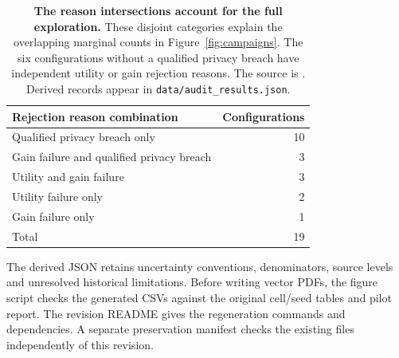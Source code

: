 \begin{table}[h]
\centering\small
\begin{tabular}{@{}lr@{}}
\toprule
Rejection reason combination & Configurations \\
\midrule
Qualified privacy breach only & 10 \\
Gain failure and qualified privacy breach & 3 \\
Utility and gain failure & 3 \\
Utility failure only & 2 \\
Gain failure only & 1 \\
\midrule
Total & 19 \\
\bottomrule
\end{tabular}
\caption{\textbf{The reason intersections account for the full exploration.}
These disjoint categories explain the overlapping marginal counts in
Figure~\ref{fig:campaigns}. The six configurations without a qualified
privacy breach have independent utility or gain rejection reasons.
The source is . Derived records appear in
\texttt{data/audit\_results.json}.}
\label{tab:intersections}
\end{table}

The derived JSON retains uncertainty conventions, denominators, source
levels and unresolved historical limitations. Before writing vector PDFs,
the figure script checks the generated CSVs against the original cell/seed
tables and pilot report. The revision README gives the regeneration
commands and dependencies. A separate preservation manifest checks the
existing  files independently of this revision.
